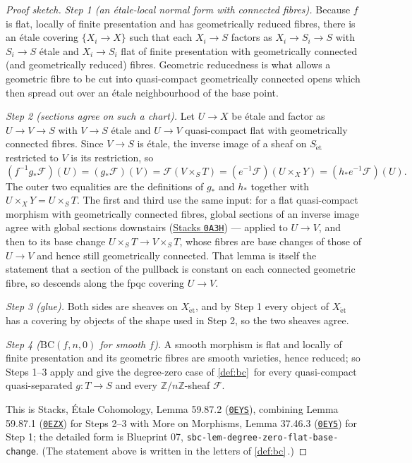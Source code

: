 \documentclass[11pt]{article}
\makeatletter
\theoremstyle{plain}
\theoremstyle{definition}
\newcommand{\Z}{\mathbb Z}
\newcommand{\Et}{\mathrm{\acute{e}t}}
\newcommand{\up}[1]{%
  \ifcsname r@#1\endcsname
    \hyperref[#1]{\texttt{\scriptsize #1}}%
  \else
    \texttt{\scriptsize #1}%
  \fi}
\newcommand{\uses}[1]{\par\smallskip\noindent{\footnotesize\textit{Uses:}\ #1\par}\smallskip}
\newcommand{\Cref}[1]{\hyperref[#1]{\ref{#1}}\,\hyperref[#1]{\nameref*{#1}}}
\makeatother
\begin{document}
\begin{proof}[Proof sketch]
\uses{\up{def:bc}}
\emph{Step 1 (an \'etale-local normal form with connected fibres).}
Because $f$ is flat, locally of finite presentation and has
geometrically reduced fibres, there is an \'etale covering
$\{X_i\to X\}$ such that each $X_i\to S$ factors as
$X_i\to S_i\to S$ with $S_i\to S$ \'etale and $X_i\to S_i$ flat of
finite presentation with geometrically connected (and geometrically
reduced) fibres.  Geometric reducedness is what allows a geometric
fibre to be cut into quasi-compact geometrically connected opens which
then spread out over an \'etale neighbourhood of the base point.

\emph{Step 2 (sections agree on such a chart).}  Let $U\to X$ be \'etale
and factor as $U\to V\to S$ with $V\to S$ \'etale and $U\to V$
quasi-compact flat with geometrically connected fibres.  Since $V\to S$
is \'etale, the inverse image of a sheaf on $S_{\Et}$ restricted to $V$
is its restriction, so
\[
 (f^{-1}g_*\mathcal F)(U)=(g_*\mathcal F)(V)
 =\mathcal F(V\times_ST)=(e^{-1}\mathcal F)(U\times_XY)
 =(h_*e^{-1}\mathcal F)(U).
\]
The outer two equalities are the definitions of $g_*$ and $h_*$ together
with $U\times_XY=U\times_ST$.  The first and third use the same input:
for a flat quasi-compact morphism with geometrically connected fibres,
global sections of an inverse image agree with global sections
downstairs (\href{https://stacks.math.columbia.edu/tag/0A3H}{Stacks \texttt{0A3H}}) --- applied to $U\to V$,
and then to its base change $U\times_ST\to V\times_ST$, whose fibres are
base changes of those of $U\to V$ and hence still geometrically
connected.  That lemma is itself the statement that a section of the
pullback is constant on each connected geometric fibre, so descends
along the fpqc covering $U\to V$.

\emph{Step 3 (glue).}  Both sides are sheaves on $X_{\Et}$, and by
Step 1 every object of $X_{\Et}$ has a covering by objects of the shape
used in Step 2, so the two sheaves agree.

\emph{Step 4 ($\mathrm{BC}(f,n,0)$ for smooth $f$).}  A smooth morphism
is flat and locally of finite presentation and its geometric fibres are
smooth varieties, hence reduced;  so Steps 1--3 apply and give the
degree-zero case of \Cref{def:bc} for every quasi-compact
quasi-separated $g:T\to S$ and every $\Z/n\Z$-sheaf $\mathcal F$.

This is Stacks, \'Etale Cohomology, Lemma 59.87.2
(\href{https://stacks.math.columbia.edu/tag/0EYS}{\texttt{0EYS}}), combining Lemma 59.87.1
(\href{https://stacks.math.columbia.edu/tag/0EZX}{\texttt{0EZX}}) for Steps 2--3 with More on Morphisms,
Lemma 37.46.3 (\href{https://stacks.math.columbia.edu/tag/0EY5}{\texttt{0EY5}}) for Step 1;  the detailed
form is Blueprint 07,
\texttt{sbc-lem-degree-zero-flat-base-change}.  (The statement above is
written in the letters of \Cref{def:bc}.)
\end{proof}
\end{document}

